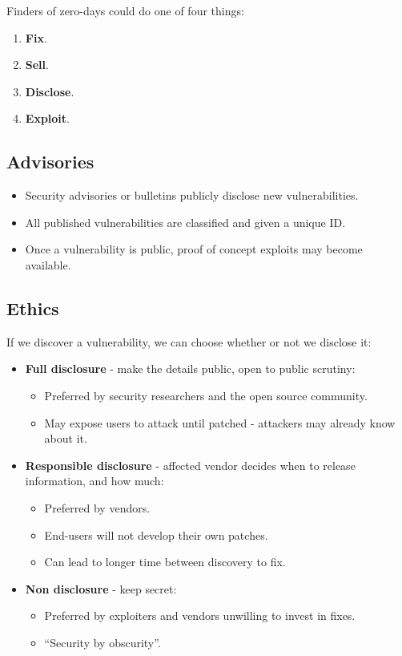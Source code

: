 \documentclass[11pt]{article}
\begin{document}
Finders of zero-days could do one of four things:
\begin{enumerate}
  \item \textbf{Fix}.
  \item \textbf{Sell}.
  \item \textbf{Disclose}.
  \item \textbf{Exploit}.
\end{enumerate}

\subsection{Advisories}
\begin{itemize}
  \item Security advisories or bulletins publicly disclose new vulnerabilities.
  \item All published vulnerabilities are classified and given a unique ID.
  \item Once a vulnerability is public, proof of concept exploits may become available.
\end{itemize}

\subsection{Ethics}
If we discover a vulnerability, we can choose whether or not we disclose it:
\begin{itemize}
  \item \textbf{Full disclosure} - make the details public, open to public scrutiny:
    \begin{itemize}
      \item Preferred by security researchers and the open source community.
      \item May expose users to attack until patched - attackers may already know about it.
    \end{itemize}
  \item \textbf{Responsible disclosure} - affected vendor decides when to release information, and how much:
    \begin{itemize}
      \item Preferred by vendors.
      \item End-users will not develop their own patches.
      \item Can lead to longer time between discovery to fix.
    \end{itemize}
  \item \textbf{Non disclosure} - keep secret:
    \begin{itemize}
      \item Preferred by exploiters and vendors unwilling to invest in fixes.
      \item ``Security by obscurity''.
    \end{itemize}
\end{itemize}
\end{document}
